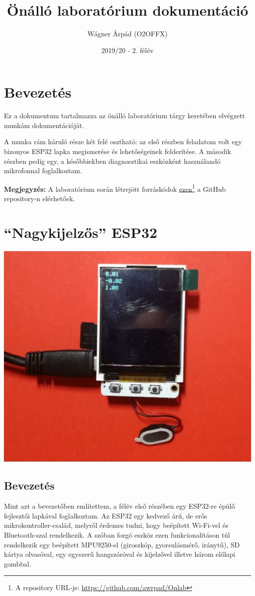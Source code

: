 \documentclass[12pt,a4paper]{article}
\title{Önálló laboratórium dokumentáció}
\author{Wágner Árpád (O2OFFX)}
\date{2019/20 - 2. félév}
\begin{document}
  \maketitle

  \section{Bevezetés}

    Ez a dokumentum tartalmazza az önálló laboratórium tárgy keretében elvégzett munkám dokumentációját.

    A munka rám háruló része két felé osztható: az első részben feladatom volt egy bizonyos ESP32 lapka megismerése és lehetőségeinek felderítése. A második részben pedig egy, a későbbiekben diagnosztikai eszközként használandó mikrofonnal foglalkoztam.

    \textbf{Megjegyzés:} A laboratórium során létrejött forráskódok \href{https://github.com/awrpad/Onlab}{ezen}\footnote{A repository URL-je: \url{https://github.com/awrpad/Onlab}} a GitHub repository-n elérhetőek.

  \newpage

  \section{``Nagykijelzős'' ESP32}
    \includegraphics[width=\textwidth]{esp32_nagykijelzo.jpg}

    \subsection{Bevezetés}
      Mint azt a bevezetőben említettem, a félév első részében egy ESP32-re épülő fejlesztői lapkával foglalkoztam.
      Az ESP32 egy kedvező árú, de erős mikrokontroller-család, melyről érdemes tudni, hogy beépített Wi-Fi-vel és Bluetooth-szal rendelkezik. A szóban forgó eszköz ezen funkcionalitáson túl rendelkezik egy beépített MPU9250-el (giroszkóp, gyorsulásmérő, iránytű), SD kártya olvasóval, egy egyszerű hangszóróval és kijelzővel illetve három előlapi gombbal.
\end{document}
